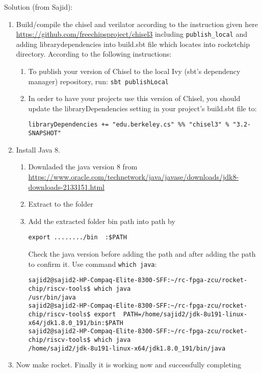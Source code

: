 \documentclass[a4paper,11pt]{article}
\begin{document}
Solution (from Sajid):
\begin{enumerate}
\item   Build/compile the chisel and verilator according to the instruction given here \url{https://github.com/freechipsproject/chisel3} including {\tt publish\_local} and adding librarydependencies into build.sbt file which locates into rocketchip directory.
     According to the following instructions:\\
     \begin{enumerate}
     \item To publish your version of Chisel to the local Ivy (sbt's dependency manager) repository, run:
     {\tt sbt publishLocal}
     \item In order to have your projects use this version of Chisel, you should update the libraryDependencies setting in your project's build.sbt file to:
     \begin{verbatim}
libraryDependencies += "edu.berkeley.cs" %% "chisel3" % "3.2-SNAPSHOT"
     \end{verbatim}
     \end{enumerate}
\item Install Java 8.
\begin{enumerate}
\item Downladed the java version 8 from \url{https://www.oracle.com/technetwork/java/javase/downloads/jdk8-downloads-2133151.html}
\item Extract to the folder
\item Add the extracted folder bin path into path by 
\begin{verbatim}export ......../bin  :$PATH
\end{verbatim}
Check the java version before adding the path and after adding the path to confirm it. Use command {\tt which java}:
\begin{lstlisting}
sajid2@sajid2-HP-Compaq-Elite-8300-SFF:~/rc-fpga-zcu/rocket-chip/riscv-tools$ which java
/usr/bin/java
sajid2@sajid2-HP-Compaq-Elite-8300-SFF:~/rc-fpga-zcu/rocket-chip/riscv-tools$ export  PATH=/home/sajid2/jdk-8u191-linux-x64/jdk1.8.0_191/bin:$PATH
sajid2@sajid2-HP-Compaq-Elite-8300-SFF:~/rc-fpga-zcu/rocket-chip/riscv-tools$ which java
/home/sajid2/jdk-8u191-linux-x64/jdk1.8.0_191/bin/java
\end{lstlisting}
\end{enumerate}
\item Now make rocket. Finally it is working now and successfully completing
\end{enumerate}
\end{document}
